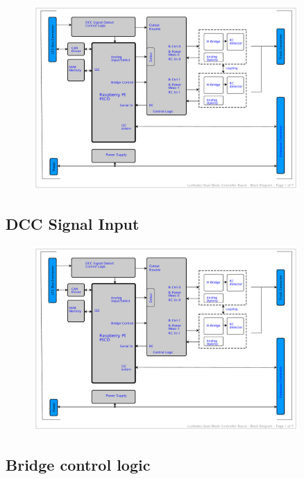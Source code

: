 \begin{figure}[htbp]
    \centering
    \includegraphics[page=2, width=0.9\textwidth]{./Schematics/Schematic_LcsNodes-Dual-Block-Controller.pdf}
\end{figure}
\FloatBarrier


\subsection{DCC Signal Input}

\begin{figure}[htbp]
    \centering
    \includegraphics[page=3, width=0.9\textwidth]{./Schematics/Schematic_LcsNodes-Dual-Block-Controller.pdf}
\end{figure}
\FloatBarrier

\subsection{Bridge control logic}

